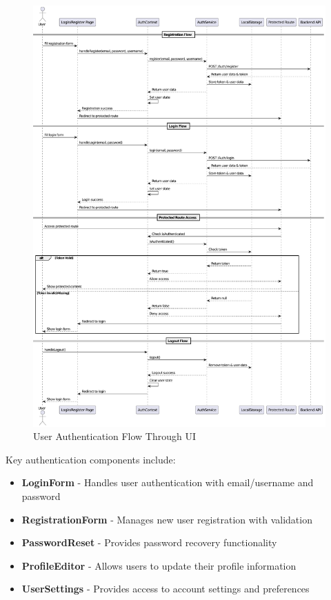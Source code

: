 \begin{figure} 
    \centering
    \includegraphics[width=\textwidth]{./Chapter07/figures/authentication_ui_flow.PDF}
    \caption{User Authentication Flow Through UI}
    \label{fig:authentication-ui-flow}
\end{figure}
\clearpage

Key authentication components include:

\begin{itemize}
  \item \textbf{LoginForm} - Handles user authentication with email/username and password
  \item \textbf{RegistrationForm} - Manages new user registration with validation
  \item \textbf{PasswordReset} - Provides password recovery functionality
  \item \textbf{ProfileEditor} - Allows users to update their profile information
  \item \textbf{UserSettings} - Provides access to account settings and preferences
\end{itemize}

